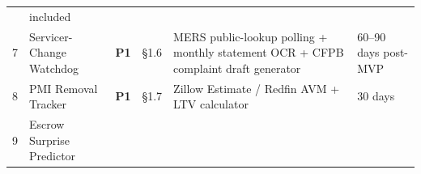 \documentclass[
  10pt,
]{article}
\begin{document}
\begin{longtable}[]{@{}llllll@{}}
\begin{minipage}[t]{0.14\columnwidth}
\end{minipage} & \begin{minipage}[t]{0.14\columnwidth}\raggedright
included\strut
\end{minipage}\tabularnewline
\begin{minipage}[t]{0.14\columnwidth}\raggedright
7\strut
\end{minipage} & \begin{minipage}[t]{0.14\columnwidth}\raggedright
Servicer-Change Watchdog\strut
\end{minipage} & \begin{minipage}[t]{0.14\columnwidth}\raggedright
\textbf{P1}\strut
\end{minipage} & \begin{minipage}[t]{0.14\columnwidth}\raggedright
§1.6\strut
\end{minipage} & \begin{minipage}[t]{0.14\columnwidth}\raggedright
MERS public-lookup polling + monthly statement OCR + CFPB complaint draft generator\strut
\end{minipage} & \begin{minipage}[t]{0.14\columnwidth}\raggedright
60--90 days post-MVP\strut
\end{minipage}\tabularnewline
\begin{minipage}[t]{0.14\columnwidth}\raggedright
8\strut
\end{minipage} & \begin{minipage}[t]{0.14\columnwidth}\raggedright
PMI Removal Tracker\strut
\end{minipage} & \begin{minipage}[t]{0.14\columnwidth}\raggedright
\textbf{P1}\strut
\end{minipage} & \begin{minipage}[t]{0.14\columnwidth}\raggedright
§1.7\strut
\end{minipage} & \begin{minipage}[t]{0.14\columnwidth}\raggedright
Zillow Estimate / Redfin AVM + LTV calculator\strut
\end{minipage} & \begin{minipage}[t]{0.14\columnwidth}\raggedright
30 days\strut
\end{minipage}\tabularnewline
\begin{minipage}[t]{0.14\columnwidth}\raggedright
9\strut
\end{minipage} & \begin{minipage}[t]{0.14\columnwidth}\raggedright
Escrow Surprise Predictor\strut

\end{minipage}
\end{longtable}
\end{document}

